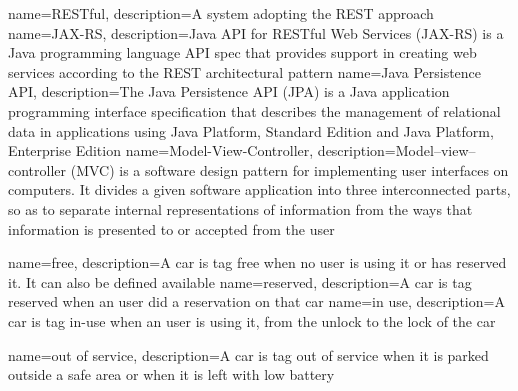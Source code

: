 

{
  name={RESTful},
  description={A system adopting the REST approach}
}
{
  name={JAX-RS},
  description={Java API for RESTful Web Services (JAX-RS)  is a Java programming language API spec that provides support in creating web services according to the REST architectural pattern}
}
{
  name={Java Persistence API},
  description={The Java Persistence API (JPA) is a Java application programming interface specification that describes the management of relational data in applications using Java Platform, Standard Edition and Java Platform, Enterprise Edition}
}
{
  name={Model-View-Controller},
  description={Model–view–controller (MVC) is a software design pattern for implementing user interfaces on computers. It divides a given software application into three interconnected parts, so as to separate internal representations of information from the ways that information is presented to or accepted from the user}
}

{
	name={free},
	description={A car is tag free when no user is using it or has reserved it. It can also be defined available}
}
{
	name={reserved},
	description={A car is tag reserved when an user did a reservation on that car}
}
{
	name={in use},
	description={A car is tag in-use when an user is using it, from the unlock to the lock of the car}
}

{
	name={out of service},
	description={A car is tag out of service when it is parked outside a safe area or when it is left with low battery}
}



